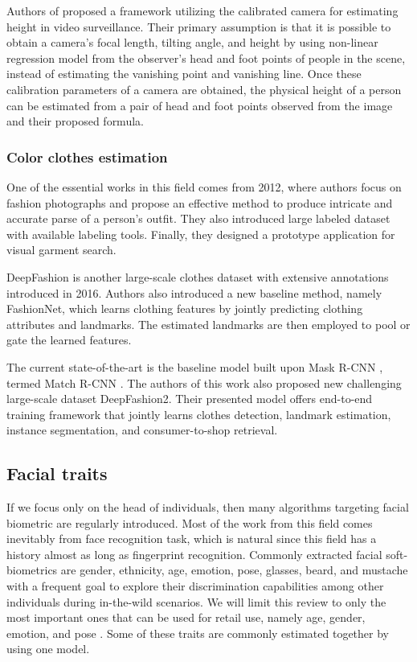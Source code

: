             Authors of \cite{li2015simplified} proposed a framework utilizing the calibrated camera for estimating height in video surveillance. Their primary assumption is that it is possible to obtain a camera's focal length, tilting angle, and height by using non-linear regression model from the observer's head and foot points of people in the scene, instead of estimating the vanishing point and vanishing line. Once these calibration parameters of a camera are obtained, the physical height of a person can be estimated from a pair of head and foot points observed from the image and their proposed formula.

        \subsubsection{Color clothes estimation}
            One of the essential works \cite{yamaguchi2012parsing} in this field comes from 2012, where authors focus on fashion photographs and propose an effective method to produce intricate and accurate parse of a person’s outfit. They also introduced large labeled dataset with available labeling tools. Finally, they designed a prototype application for visual garment search.
            
            DeepFashion \cite{liu2016deepfashion} is another large-scale clothes dataset with extensive annotations introduced in 2016. Authors also introduced a new baseline method, namely FashionNet, which learns clothing features by jointly predicting clothing attributes and landmarks. The estimated landmarks are then employed to pool or gate the learned features. 
            
            The current state-of-the-art is the baseline model built upon Mask R-CNN \cite{he2017mask}, termed Match R-CNN \cite{ge2019deepfashion2}. The authors of this work also proposed new challenging large-scale dataset DeepFashion2. Their presented model offers end-to-end training framework that jointly learns clothes detection, landmark estimation, instance segmentation, and consumer-to-shop retrieval. 

    \subsection{Facial traits}
        If we focus only on the head of individuals, then many algorithms targeting facial biometric \cite{wang2018deep} are regularly introduced. Most of the work from this field comes inevitably from face recognition task, which is natural since this field has a history almost as long as fingerprint recognition. Commonly extracted facial soft-biometrics are gender, ethnicity, age, emotion, pose, glasses, beard, and mustache with a frequent goal to explore their discrimination capabilities among other individuals during in-the-wild scenarios. We will limit this review to only the most important ones that can be used for retail use, namely age, gender, emotion, and pose \cite{balaban2015deep}. Some of these traits are commonly estimated together by using one model.
        
